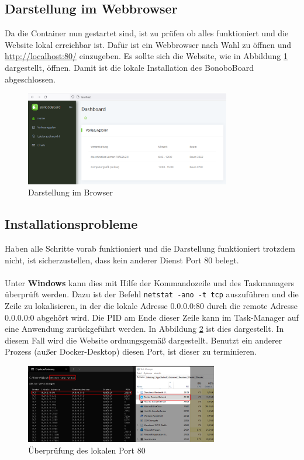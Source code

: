 \documentclass[a4paper,11pt]{scrartcl}
\begin{document}
\subsection{Darstellung im Webbrowser}
Da die Container nun gestartet sind, ist zu prüfen ob alles funktioniert und die Website lokal erreichbar ist.
Dafür ist ein Webbrowser nach Wahl zu öffnen und \url{http://localhost:80/} einzugeben.
Es sollte sich die Website, wie in Abbildung \ref{img:darstellung} dargestellt, öffnen.
Damit ist die lokale Installation des BonoboBoard abgeschlossen.
\begin{figure}[H]
\begin{center}
\includegraphics[width=0.8\textwidth]{webbrowser_localhost}
\caption{Darstellung im Browser}
\label{img:darstellung}
\end{center}
\end{figure}
\subsection{Installationsprobleme}
Haben alle Schritte vorab funktioniert und die Darstellung funktioniert trotzdem nicht, ist sicherzustellen, dass kein anderer Dienst Port 80 belegt.\\
\\
Unter \textbf{Windows} kann dies mit Hilfe der Kommandozeile und des Taskmanagers überprüft werden.
Dazu ist der Befehl \texttt{netstat -ano -t tcp} auszuführen und die Zeile zu lokalisieren,
in der die lokale Adresse 0.0.0.0:80 durch die remote Adresse 0.0.0.0:0 abgehört wird.
Die PID am Ende dieser Zeile kann im Task-Manager auf eine Anwendung zurückgeführt werden.
In Abbildung \ref{img:netstat} ist dies dargestellt. In diesem Fall wird die Website ordnungsgemäß dargestellt.
Benutzt ein anderer Prozess (außer Docker-Desktop) diesen Port, ist dieser zu terminieren.
\begin{figure}[H]
\begin{center}
\includegraphics[width=0.75\textwidth]{netstat_port80}
\caption{Überprüfung des lokalen Port 80}
\label{img:netstat}
\end{center}
\end{figure}
\end{document}
